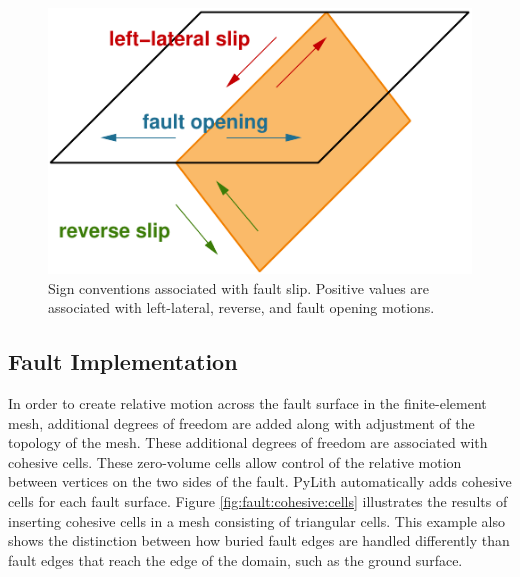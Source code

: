 \noindent \begin{center}
\begin{figure}[H]
\begin{centering}
\includegraphics{boundaryconditions/figs/slipmotions}
\par\end{centering}

\caption{Sign conventions associated with fault slip. Positive values are associated
with left-lateral, reverse, and fault opening motions.\label{fig:fault:slip:motions} }
\end{figure}

\par\end{center}


\subsection{Fault Implementation}

In order to create relative motion across the fault surface in the
finite-element mesh, additional degrees of freedom are added along
with adjustment of the topology of the mesh. These additional degrees
of freedom are associated with cohesive cells. These zero-volume cells
allow control of the relative motion between vertices on the two sides
of the fault. PyLith automatically adds cohesive cells for each fault
surface. Figure \vref{fig:fault:cohesive:cells} illustrates the results
of inserting cohesive cells in a mesh consisting of triangular cells.
This example also shows the distinction between how buried fault edges
are handled differently than fault edges that reach the edge of the
domain, such as the ground surface.

